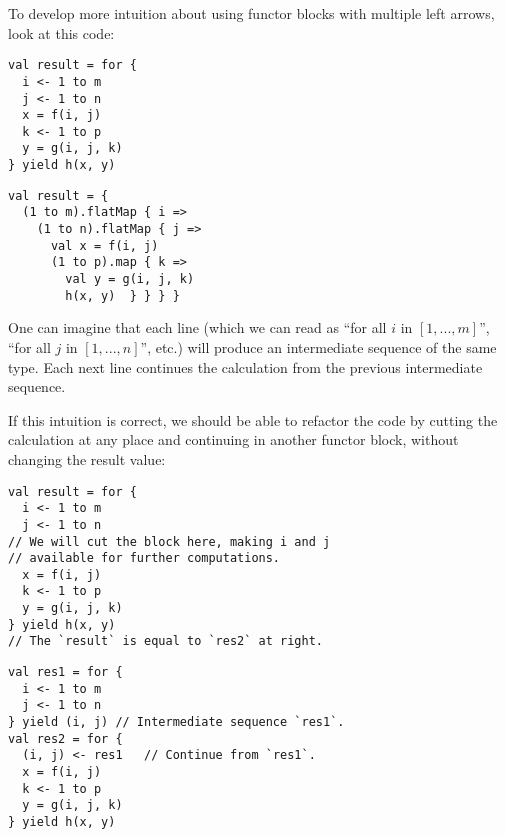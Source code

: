 To develop more intuition about using functor blocks with multiple
left arrows, look at this code:

\noindent \texttt{\textcolor{blue}{\footnotesize{}}}%
\begin{minipage}[c]{0.475\columnwidth}%
\texttt{\textcolor{blue}{\footnotesize{}}}
\begin{lstlisting}
val result = for {
  i <- 1 to m
  j <- 1 to n
  x = f(i, j)
  k <- 1 to p
  y = g(i, j, k)
} yield h(x, y)
\end{lstlisting}
%
\end{minipage}\texttt{\textcolor{blue}{\footnotesize{}\hspace*{\fill}}}%
\begin{minipage}[c]{0.475\columnwidth}%
\texttt{\textcolor{blue}{\footnotesize{}}}
\begin{lstlisting}
val result = {
  (1 to m).flatMap { i =>
    (1 to n).flatMap { j =>
      val x = f(i, j)
      (1 to p).map { k =>
        val y = g(i, j, k)
        h(x, y)  } } } }
\end{lstlisting}
%
\end{minipage}{\footnotesize\par}

\vspace{0.2\baselineskip}
One can imagine that each line (which we can read as \textsf{``}for all $i$
in $\left[1,...,m\right]$\textsf{''}, \textsf{``}for all $j$ in $\left[1,...,n\right]$\textsf{''},
etc.) will produce an intermediate sequence of the same type. Each
next line continues the calculation from the previous intermediate
sequence. 

If this intuition is correct, we should be able to refactor the code
by cutting the calculation at any place and continuing in another
functor block, without changing the result value:

\noindent \texttt{\textcolor{blue}{\footnotesize{}}}%
\begin{minipage}[c]{0.475\columnwidth}%
\texttt{\textcolor{blue}{\footnotesize{}}}
\begin{lstlisting}
val result = for {
  i <- 1 to m
  j <- 1 to n
// We will cut the block here, making i and j
// available for further computations.
  x = f(i, j)
  k <- 1 to p
  y = g(i, j, k)
} yield h(x, y)
// The `result` is equal to `res2` at right.
\end{lstlisting}
%
\end{minipage}\texttt{\textcolor{blue}{\footnotesize{}\hspace*{\fill}}}%
\begin{minipage}[c]{0.475\columnwidth}%
\texttt{\textcolor{blue}{\footnotesize{}}}
\begin{lstlisting}
val res1 = for {
  i <- 1 to m
  j <- 1 to n
} yield (i, j) // Intermediate sequence `res1`.
val res2 = for {
  (i, j) <- res1   // Continue from `res1`.
  x = f(i, j)
  k <- 1 to p
  y = g(i, j, k)
} yield h(x, y)
\end{lstlisting}
%
\end{minipage}{\footnotesize\par}

